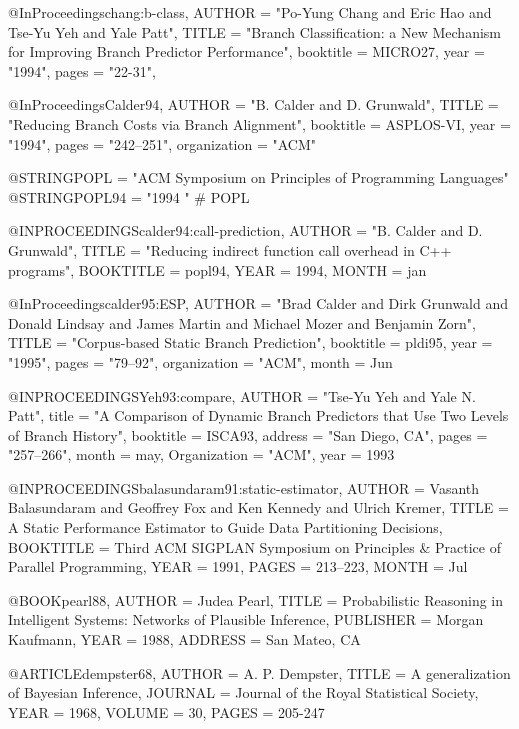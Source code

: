 @InProceedings{chang:b-class,
	AUTHOR = "{Po-Yung} Chang and Eric Hao and Tse-Yu Yeh and Yale Patt",
	TITLE = "Branch Classification: a New Mechanism for Improving Branch Predictor Performance",
	booktitle = MICRO27,
	year =   "1994",
        pages = "22-31",
}

@InProceedings{Calder94,
	AUTHOR = "B. Calder and D. Grunwald",
	TITLE = "Reducing Branch Costs via Branch Alignment",
	booktitle = ASPLOS-VI,
	year =   "1994",
        pages = "242--251",
	organization = "ACM"
}

@STRING{POPL = "ACM Symposium on Principles of Programming Languages"}
@STRING{POPL94 = "1994 " # POPL}

@INPROCEEDINGS{calder94:call-prediction,
        AUTHOR = "B. Calder and D. Grunwald",
        TITLE = "Reducing indirect function call overhead in {C++} programs",
        BOOKTITLE = popl94,
        YEAR = 1994,
        MONTH = jan
}


@InProceedings{calder95:ESP,
	AUTHOR = "Brad Calder and Dirk Grunwald and Donald Lindsay and James Martin and Michael Mozer and Benjamin Zorn",
	TITLE = "Corpus-based Static Branch Prediction",
	booktitle = pldi95,
	year =   "1995",
        pages = "79--92",
	organization = "ACM",
        month = Jun
}

@INPROCEEDINGS{Yeh93:compare,
           AUTHOR = "Tse-Yu Yeh and Yale N. Patt",
           title = "A Comparison of Dynamic Branch Predictors that Use Two Levels of Branch History",
           booktitle = ISCA93,
           address = "San Diego, CA",
           pages = "257--266",
           month = may,
           Organization = "ACM",
           year = 1993
}

@INPROCEEDINGS{balasundaram91:static-estimator,
	AUTHOR = {Vasanth Balasundaram and Geoffrey Fox and
		   Ken Kennedy and Ulrich Kremer},
	TITLE = {A Static Performance Estimator to Guide Data Partitioning Decisions},
	BOOKTITLE = {Third ACM SIGPLAN Symposium on 
		Principles \& Practice of Parallel Programming},
	YEAR = {1991},
	PAGES = {213--223},
	MONTH = Jul
}

@BOOK{pearl88,
	AUTHOR = {Judea Pearl},
	TITLE = {Probabilistic Reasoning in Intelligent Systems:
Networks of Plausible Inference},
	PUBLISHER = {Morgan Kaufmann},
	YEAR = {1988},
	ADDRESS = {San Mateo, CA}
}

@ARTICLE{dempster68,
	AUTHOR = {A. P. Dempster},
	TITLE = {A generalization of Bayesian Inference},
	JOURNAL = {Journal of the Royal Statistical Society},
	YEAR = {1968},
	VOLUME = {30},
	PAGES = {205-247}
}

